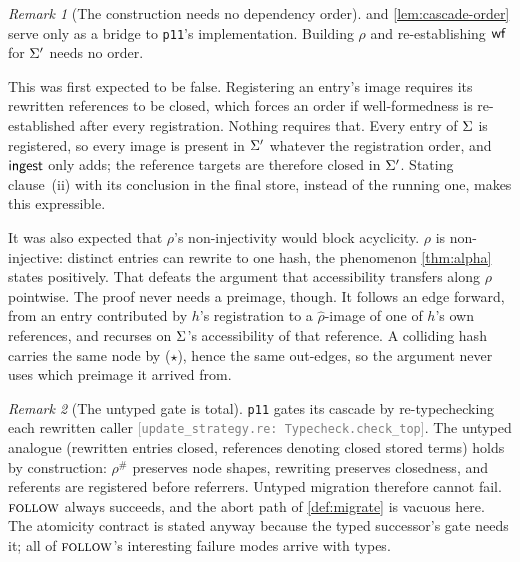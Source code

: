 \documentclass[11pt]{article}
\theoremstyle{definition}
\theoremstyle{plain}
\theoremstyle{remark}
\newtheorem{remark}{Remark}[section]
\newcommand{\src}[1]{{\footnotesize\textcolor{gray}{[\texttt{#1}]}}}
\begin{document}
\begin{remark}[The construction needs no dependency order]\label{rem:noorder}
 and \cref{lem:cascade-order} serve only as a bridge to \texttt{p11}'s
implementation. Building $\rho$ and re-establishing $\mathsf{wf}$ for $\Sigma'$ needs no order.

This was first expected to be false. Registering an entry's image requires its rewritten
references to be closed, which forces an order if well-formedness is re-established after
every registration. Nothing requires that. Every entry of $\Sigma$ is registered, so every
image is present in $\Sigma'$ whatever the registration order, and $\mathsf{ingest}$ only adds; the
reference targets are therefore closed in $\Sigma'$. Stating clause~(ii) with its conclusion
in the final store, instead of the running one, makes this expressible.

It was also expected that $\rho$'s non-injectivity would block acyclicity. $\rho$ is
non-injective: distinct entries can rewrite to one hash, the phenomenon \cref{thm:alpha}
states positively. That defeats the argument that accessibility transfers along $\rho$
pointwise. The proof never needs a preimage, though. It follows an edge forward, from an entry
contributed by $h$'s registration to a $\hat\rho$-image of one of $h$'s own references, and
recurses on $\Sigma$'s accessibility of that reference. A colliding hash carries the same node
by ($\star$), hence the same out-edges, so the argument never uses which preimage it arrived
from.
\end{remark}

\begin{remark}[The untyped gate is total]\label{rem:gate}
\texttt{p11} gates its cascade by re-typechecking each rewritten caller
\src{update\_strategy.re: Typecheck.check\_top}. The untyped analogue (rewritten entries
closed, references denoting closed stored terms) holds by construction: $\rho^{\#}$ preserves
node shapes, rewriting preserves closedness, and referents are registered before referrers.
Untyped migration therefore cannot fail. $\textsc{follow}$ always succeeds, and the abort path of
\cref{def:migrate} is vacuous here. The atomicity contract is stated anyway because the typed
successor's gate needs it; all of $\textsc{follow}$'s interesting failure modes arrive with types.
\end{remark}
\end{document}
